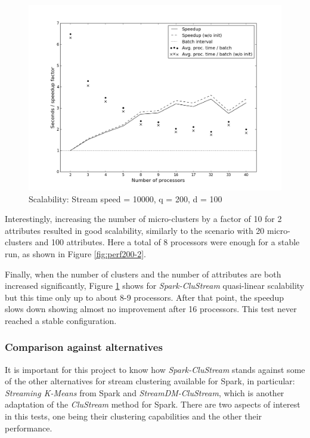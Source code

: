\documentclass{llncs}
\begin{document}
\begin{figure}[h!]
 \centering
 \includegraphics[scale=0.4]{./styles/perf200-100.png}
 \caption{Scalability: Stream speed = 10000, q = 200, d = 100}
 \label{fig:perf200-100}
\end{figure}

Interestingly, increasing the number of micro-clusters by a factor of 10 for 2 attributes resulted in good scalability, similarly to the scenario with 20 micro-clusters and 100 attributes. Here a total of 8 processors were enough for a stable run, as shown in Figure \ref{fig:perf200-2}.



Finally, when the number of clusters and the number of attributes are both increased significantly, Figure \ref{fig:perf200-100} shows for \textit{Spark-CluStream} quasi-linear scalability but this time only up to about 8-9 processors. After that point, the speedup slows down showing almost no improvement after 16 processors. This test never reached a stable configuration.

\subsubsection{Comparison against alternatives}

It is important for this project to know how \textit{Spark-CluStream} stands against some of the other alternatives for stream clustering available for Spark, in particular: \textit{Streaming K-Means} from Spark and \textit{StreamDM-CluStream}, which is another adaptation of the \textit{CluStream} method for Spark. There are two aspects of interest in this tests, one being their clustering capabilities and the other their performance.
\end{document}
